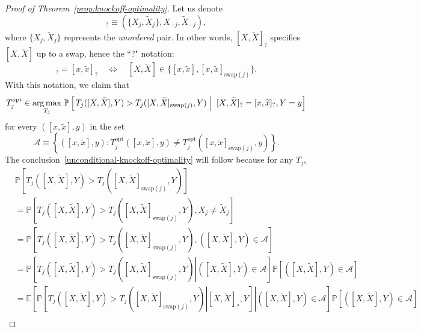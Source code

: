 \documentclass[ejs]{imsart}
\numberwithin{equation}{section}
\theoremstyle{plain}
\theoremstyle{definition}
\theoremstyle{remark}
\newcommand{\srx}{X}
\newcommand{\sfx}{x}
\newcommand{\srxk}{\widetilde X}
\newcommand{\sfxk}{\widetilde x}
\newcommand{\sry}{Y}
\newcommand{\sfy}{y}
\begin{document}
\begin{proof}[Proof of Theorem~\ref{prop:knockoff-optimality}]
	Let us denote
	\begin{equation*}
	[\srx, \srxk]_{?} \equiv (\{\srx_j, \srxk_j\}, \srx_{-j}, \srxk_{-j}),
	\end{equation*}
	where $\{\srx_j, \srxk_j\}$ represents the \textit{unordered} pair. In other words, $[\srx, \srxk]_{?}$ specifies $[\srx, \srxk]$ up to a swap, hence the ``?" notation: 
	\begin{equation*}
	[\srx, \srxk]_{?} = [\sfx, \sfxk]_{?} \quad \Longleftrightarrow \quad [\srx, \srxk] \in \{[\sfx, \sfxk], [\sfx, \sfxk]_{\text{swap}(j)}\}.
	\end{equation*}
	With this notation, we claim that
	\begin{equation}
	T_j^{\textnormal{opt}} \in \underset{T_j}{\arg \max}\ \mathbb P\left[\left. T_j([\srx, \srxk], \sry) > T_j([\srx, \srxk]_{\text{swap}(j)}, \sry)\ \right|\ [\srx, \srxk]_? = [\sfx, \sfxk]_?, \sry = \sfy\right] 
	\label{knockoff-conditional-optimality}
	\end{equation}
	for every $([\sfx, \sfxk], \sfy)$ in the set 
	\begin{equation}
	\mathcal A \equiv \left\{([\sfx, \sfxk], \sfy): T^{\text{opt}}_j([\sfx, \sfxk], \sfy) \neq T^{\text{opt}}_j([\sfx, \sfxk]_{\text{swap}(j)}, \sfy)\right\}. 
	\label{nondegeneracy}
	\end{equation}
	The conclusion~\eqref{unconditional-knockoff-optimality} will follow because for any $T_j$, 
	\begin{equation*}
	\begin{split}
	&\mathbb P[T_j([\srx, \srxk], \sry) > T_j([\srx, \srxk]_{\text{swap}(j)}, \sry)] \\
	&= \mathbb P[T_j([\srx, \srxk], \sry) > T_j([\srx, \srxk]_{\text{swap}(j)}, \sry), \srx_j \neq \srxk_j] \\
	&= \mathbb P[T_j([\srx, \srxk], \sry) > T_j([\srx, \srxk]_{\text{swap}(j)}, \sry), ([\srx, \srxk], \sry) \in \mathcal A] \\
	&= \mathbb P\left[\left.T_j([\srx, \srxk], \sry) > T_j([\srx, \srxk]_{\text{swap}(j)}, \sry)\right| ([\srx, \srxk], \sry) \in \mathcal A\right]\mathbb P[([\srx, \srxk], \sry) \in \mathcal A] \\
	&= \mathbb E\left[\left.\mathbb P\left[\left.T_j([\srx, \srxk], \sry) > T_j([\srx, \srxk]_{\text{swap}(j)}, \sry)\right| [\srx, \srxk]_?, \sry\right]\right|([\srx, \srxk], \sry) \in \mathcal A\right]\mathbb P[([\srx, \srxk], \sry) \in \mathcal A] \\

\end{split}
\end{equation*}
\end{proof}
\end{document}
